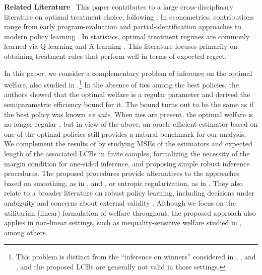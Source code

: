 \documentclass[12pt]{article}
\numberwithin{equation}{section}
\theoremstyle{plain}                         %
\theoremstyle{definition}                  %
\theoremstyle{remark}                      %
\begin{document}
\medskip 

\noindent 
\textbf{Related Literature} \,
This paper contributes to a large cross-disciplinary literature on optimal treatment choice, following \citet{Manski2004}. In econometrics, contributions range from early program-evaluation and partial-identification approaches to modern policy learning \citep{DEHEJIA2005141,HiranoPorter2009,Stoye,Chamberlain2011,BhatacharyaDupas2012,Tetenov2012,Rai2019,KitagawaTetenov,MbakopTabord,  AtheyWager2, Sun,SasakiUra,KitagawaLeeChen2022,Yata2021,ArmstrongShen2023,chernozhukov2025polece,Moon:25}. In statistics, optimal treatment regimes are commonly learned via Q-learning and A-learning \citep{QianMurphy,Murphy2003,Robins2004,ShiEtAl2018}. This literature focuses primarily on obtaining treatment rules that perform well in terms of expected regret. 


In this paper, we consider a complementary problem of inference on the optimal welfare, also studied in \citet{LuedtkeLaan}.\footnote{This problem is distinct from the ``inference on winners'' considered in \citet{andrews2024inference}, \citet{andrewschen2025}, and \citet{chernozhukov2025polece}, and the proposed LCBs are generally not valid in those settings. }  In the absence of ties among the best policies, the authors showed that the optimal welfare is a regular parameter and derived the semiparametric efficiency bound for it. The bound turns out to be the same as if the best policy was known \textit{ex ante}. When ties are present, the optimal welfare is no longer regular \citep{HiranoPorter2012}, but in view of the above, an oracle efficient estimator based on one of the optimal policies still provides a natural benchmark for our analysis. We complement the results of \citet{LuedtkeLaan} by studying MSEs of the estimators and expected length of the associated LCBs in finite samples, formalizing the necessity of the margin condition for one-sided inference, and proposing simple robust inference procedures.  The proposed procedures provide alternatives to the approaches based on smoothing, as in   \citet{chen2023inference}, \citet{levis2023covariateassisted} and \citet{whitehouse2025}, or entropic regularization, as in \citet{benmichael2025}. They also relate to a broader literature on robust policy learning, including decisions under ambiguity \citep{benmichael2021safepolicy,cui2024policy} and concerns about external validity \cite{adjaho2023externally}. Although we focus on the utilitarian (linear) formulation of welfare throughout, the proposed approach also applies in non-linear settings, such as inequality-sensitive welfare studied in \citet{kasy2016partial, kitagawa2021equality, terschuur2025locally}, among others.
\end{document}
